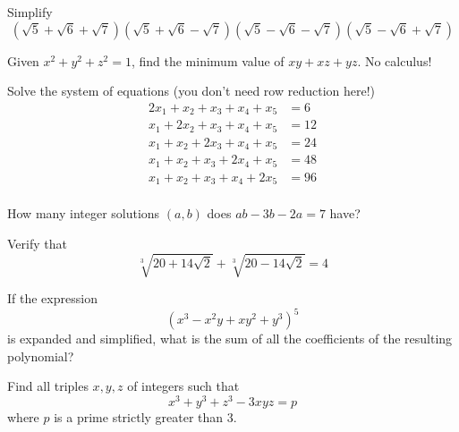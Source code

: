 \documentclass[12pt]{article}
\begin{document}
        \begin{exercise}
            Simplify
            \[\left(\sqrt{5}+\sqrt{6}+\sqrt{7}\right)\left(\sqrt{5}+\sqrt{6}-\sqrt{7}\right)\left(\sqrt{5}-\sqrt{6}-\sqrt{7}\right)\left(\sqrt{5}-\sqrt{6}+\sqrt{7}\right)\]
        \end{exercise}

        \begin{exercise}
            Given $x^2 + y^2 + z^2 = 1$, find the minimum value of $xy+xz+yz$. No calculus!
        \end{exercise}

        \begin{exercise}
            Solve the system of equations (you don't need row reduction here!)
            \begin{align*}
                2x_1+x_2+x_3+x_4+x_5&=6 \\
                x_1+2x_2+x_3+x_4+x_5&=12 \\
                x_1+x_2+2x_3+x_4+x_5&=24 \\
                x_1+x_2+x_3+2x_4+x_5&=48 \\
                x_1+x_2+x_3+x_4+2x_5&=96 \\
            \end{align*}
        \end{exercise}

        \begin{exercise}
            How many integer solutions \((a,b)\) does \(ab-3b-2a=7\) have?
        \end{exercise}

        \begin{exercise}
            Verify that
            \[\sqrt[3]{20+14\sqrt{2}}+\sqrt[3]{20-14\sqrt{2}}=4\]
        \end{exercise}

        \begin{exercise}
            If the expression 
            \[(x^3-x^2y+xy^2+y^3)^5\] 
            is expanded and simplified, what is the sum of all the coefficients of the resulting polynomial?
        \end{exercise}

        \begin{exercise}
            Find all triples $x,y,z$ of integers such that 
            \begin{equation*}
                x^3 + y^3 + z^3 -3xyz = p
            \end{equation*}
            where $p$ is a prime strictly greater than 3.
        \end{exercise}
            
\end{document}
